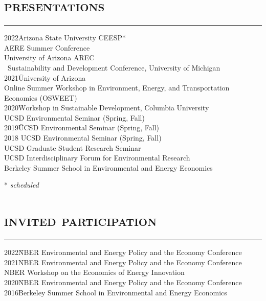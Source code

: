 \documentclass[letterpaper]{article}
\begin{document}
\section*{\textsc{\textbf{presentations}}}
\hrule 
\vspace{.2cm}
\begin{tabbing}
2022\quad \=Arizona State University CEESP* \\ \> AERE Summer Conference\\ \> University of Arizona AREC  \\ \ \>Sustainability and Development Conference, University of Michigan \\
2021\quad \= University of Arizona \\
\> Online Summer Workshop in Environment, Energy, and Transportation Economics (OSWEET)  \\
2020\quad \= Workshop in Sustainable Development, Columbia University  \\
\> UCSD Environmental Seminar (Spring, Fall) \\
2019\quad \= UCSD Environmental Seminar (Spring, Fall) \\ 
2018  \> UCSD Environmental Seminar (Spring, Fall) \\
 \> UCSD Graduate Student Research Seminar \\
 \> UCSD Interdisciplinary Forum for Environmental Research \\
 \> Berkeley Summer School in Environmental and Energy Economics  
\end{tabbing}

* \emph{scheduled}

\section*{\textsc{\textbf{invited participation}}}
\hrule 
\vspace{.2cm}
\begin{tabbing}
2022\quad \= NBER Environmental and Energy Policy and the Economy Conference \\ 
2021\quad \= NBER Environmental and Energy Policy and the Economy Conference \\
\> NBER Workshop on the Economics of Energy Innovation \\
2020\quad \= NBER Environmental and Energy Policy and the Economy Conference\\ 
2016\quad \= Berkeley Summer School in Environmental and Energy Economics

\end{tabbing}
\end{document}
